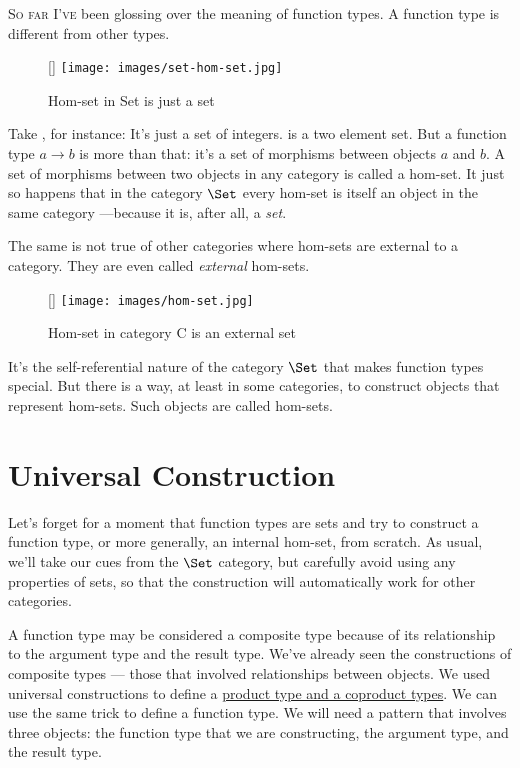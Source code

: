 \lettrine[lhang=0.17]{S}{o far I've} been glossing over the meaning of function types. A function
type is different from other types.

\begin{wrapfigure}[12]{R}{0pt}
\raisebox{0pt}[\dimexpr{}\baselineskip\relax]{
\texttt{[image: images/set-hom-set.jpg]}}%
\caption{Hom-set in Set is just a set}
\end{wrapfigure}

Take , for instance: It's just a set of integers.
 is a two element set. But a function type
$a\to b$ is more than that: it's a set of morphisms
between objects $a$ and $b$. A set of morphisms between
two objects in any category is called a hom-set. It just so happens that
in the category $\Set$ every hom-set is itself an object in the
same category ---because it is, after all, a \emph{set}.

The same is not true of other categories where hom-sets are external to
a category. They are even called \emph{external} hom-sets.

\pagebreak
\begin{wrapfigure}[11]{R}{0pt}
\raisebox{0pt}[\dimexpr\height]{
\texttt{[image: images/hom-set.jpg]}}%
\caption{Hom-set in category C is an external set}
\end{wrapfigure}

\noindent
It's the self-referential nature of the category $\Set$ that makes
function types special. But there is a way, at least in some categories,
to construct objects that represent hom-sets. Such objects are called
 hom-sets.

\section{Universal Construction}

Let's forget for a moment that function types are sets and try to
construct a function type, or more generally, an internal hom-set, from
scratch. As usual, we'll take our cues from the $\Set$ category,
but carefully avoid using any properties of sets, so that the
construction will automatically work for other categories.

A function type may be considered a composite type because of its
relationship to the argument type and the result type. We've already
seen the constructions of composite types --- those that involved
relationships between objects. We used universal constructions to define
a \hyperref[products-and-coproducts]{product
type and a coproduct types}. We can use the same trick to define a
function type. We will need a pattern that involves three objects: the
function type that we are constructing, the argument type, and the
result type.

